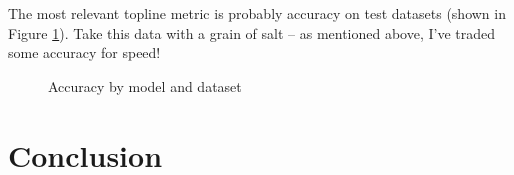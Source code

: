 \documentclass{article}
\begin{document}
The most relevant topline metric is probably accuracy on test datasets (shown in Figure \ref{fig:accuracy}). Take this data with a grain of salt -- as mentioned above, I've traded some accuracy for speed!

\begin{figure}[htbp]
\centering
{}
\caption{Accuracy by model and dataset}
\label{fig:accuracy}
\end{figure}

\section{Conclusion}

\printbibliography[heading=bibintoc,title={References}]
\end{document}
